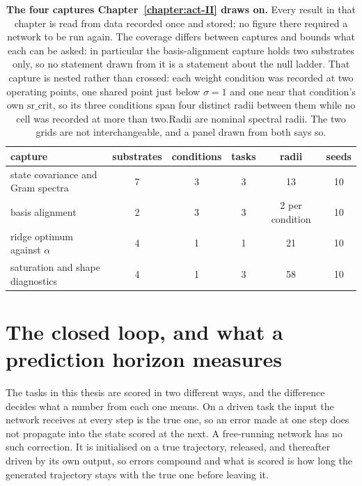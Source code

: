 \begin{table}[ht]
    \centering
    \caption[The captures Chapter 5 draws on]{\textbf{The four captures
    Chapter~\ref{chapter:act-II} draws on.} Every result in that chapter is read
    from data recorded once and stored; no figure there required a network to be
    run again. The coverage differs between captures and bounds what each can be
    asked: in particular the basis-alignment capture holds two substrates only,
    so no statement drawn from it is a statement about the null ladder. 
    That capture is nested rather than crossed: each weight condition was
    recorded at two operating points, one shared point just below
    $\sigma = 1$ and one near that condition's own
    $\mathrm{sr\_crit}$, %
    so its three conditions span four distinct radii between them while no cell
    was recorded at more than two.Radii are
    nominal spectral radii. The two grids are not interchangeable, and a panel
    drawn from both says so.}
    \label{tab:methods-captures}
    \begin{tabular}{lccccc}
        \toprule
        capture & substrates & conditions & tasks & radii & seeds \\
        \midrule
        state covariance and Gram spectra & 7 & 3 & 3 & 13 & 10 \\ %
        basis alignment & 2 & 3 & 3 & 2 per condition & 10 \\ %
        ridge optimum against $\alpha$ & 4 & 1 & 1 & 21 & 10 \\ %
        saturation and shape diagnostics & 4 & 1 & 3 & 58 & 10 \\ %
        \bottomrule
    \end{tabular}
\end{table}



\section{The closed loop, and what a prediction horizon measures}
\label{sec:methods-closed-loop}
\bigskip

The tasks in this thesis are scored in two different ways, and the difference
decides what a number from each one means. On a driven task the input the network
receives at every step is the true one, so an error made at one step does not
propagate into the state scored at the next. A free-running network has no such
correction. It is initialised on a true trajectory, released, and thereafter
driven by its own output, so errors compound and what is scored is how long the
generated trajectory stays with the true one before leaving it.

